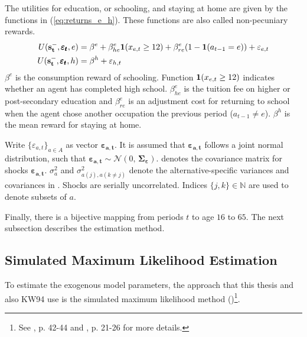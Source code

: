 \documentclass[a4paper,12pt]{article}
\begin{document}
The utilities for education, or schooling, and staying at home are given by the functions in (\ref{eq:returns_e_h}). These functions are also called non-pecuniary rewards.
\begin{equation} \label{eq:returns_e_h}
\begin{aligned}
U(\bold{s_t^-}, \pmb{\varepsilon_t},e) &= \beta^e + \beta_{he}^e \bold 1(x_{e,t} \geq 12) + \beta_{re}^e(1-\bold1(a_{t-1}=e)) + \varepsilon_{e,t} \\
U(\bold{s_t^-},\pmb{\varepsilon_t},h) &= \beta^h + \varepsilon_{h,t} \\
\end{aligned}
\end{equation}
\noindent
$\beta^e$ is the consumption reward of schooling. Function $\bold 1(x_{e,t} \geq 12)$ indicates whether an agent has completed high school. $\beta_{he}^e$ is the tuition fee on higher or post-secondary education and $\beta_{re}^e$ is an adjustment cost for returning to school when the agent chose another occupation the previous period ($a_{t-1}\neq e$). $\beta^h$ is the mean reward for staying at home.

Write $\{\varepsilon_{a,t}\}_{a \in A}$ as vector $\pmb{\varepsilon_{a,t}}$. It is assumed that $\pmb{\varepsilon_{a,t}}$ follows a joint normal distribution, such that $\pmb{\varepsilon_{a,t}} \sim \mathcal{N}(0,\,\pmb{\Sigma_\varepsilon})$. \pmb{$\Sigma_\varepsilon$} denotes the covariance matrix for shocks $\pmb{\varepsilon_{a,t}}$. $\sigma_a^{2}$ and $\sigma^{2}_{a(j),a(k\neq j)}$ denote the alternative-specific variances and covariances in \pmb{$\Sigma_\varepsilon$}. Shocks are serially uncorrelated. Indices $\{j,k\} \in \mathbb{N}$ are used to denote subsets of $a$.

Finally, there is a bijective mapping from periods $t$ to age $16$ to $65$. The next subsection describes the estimation method.

\subsection{Simulated Maximum Likelihood Estimation}

To estimate the exogenous model parameters, the approach that this thesis and also KW94 use is the simulated maximum likelihood method (\cite{Albright.1977})\footnote{See \cite{Aguirregabiria.2010}, p. 42-44 and \cite{Raabe.2019}, p. 21-26 for more details.}.
\end{document}
